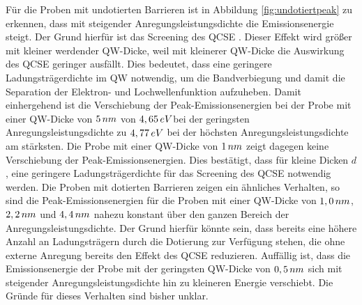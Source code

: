 \noindent 
Für die Proben mit undotierten Barrieren ist in Abbildung \ref{fig:undotiertpeak} zu erkennen, dass mit steigender Anregungsleistungsdichte die Emissionsenergie steigt. Der Grund hierfür ist das Screening des QCSE \cite{doi:10.1063/1.1763211}. Dieser Effekt wird größer mit kleiner werdender QW-Dicke, weil mit kleinerer QW-Dicke die Auswirkung des QCSE geringer ausfällt. Dies bedeutet, dass eine geringere Ladungsträgerdichte im QW notwendig, um die Bandverbiegung und damit die Separation der Elektron- und Lochwellenfunktion aufzuheben. 
\newline
Damit einhergehend ist die Verschiebung der Peak-Emissionsenergien bei der Probe mit einer QW-Dicke von $5 \thinspace nm$ von $4,65 \thinspace eV$bei der geringsten Anregungsleistungsdichte zu $4,77 \thinspace eV$ bei der höchsten Anregungsleistungsdichte am stärksten. 
\newline 
Die Probe mit einer QW-Dicke von $1 \thinspace nm$ zeigt dagegen keine Verschiebung der Peak-Emissionsenergien. Dies bestätigt, dass für kleine Dicken $d$, eine geringere Ladungsträgerdichte für das Screening des QCSE notwendig werden.
\newline
Die Proben mit dotierten Barrieren zeigen ein ähnliches Verhalten, so sind die Peak-Emissionsenergien für die Proben mit einer QW-Dicke von 
$1,0 \thinspace nm$, $2,2 \thinspace nm$ und $4,4 \thinspace nm$ nahezu konstant über den ganzen Bereich der Anregungsleistungsdichte.
Der Grund hierfür könnte sein, dass bereits eine höhere Anzahl an Ladungsträgern durch die Dotierung zur Verfügung stehen, die ohne externe Anregung bereits den Effekt des QCSE reduzieren.
\newline
Auffällig ist, dass die Emissionsenergie der Probe mit der geringsten QW-Dicke von $0,5 \thinspace nm$ sich mit steigender Anregungsleistungsdichte hin zu kleineren Energie verschiebt. Die Gründe für dieses Verhalten sind bisher unklar.
